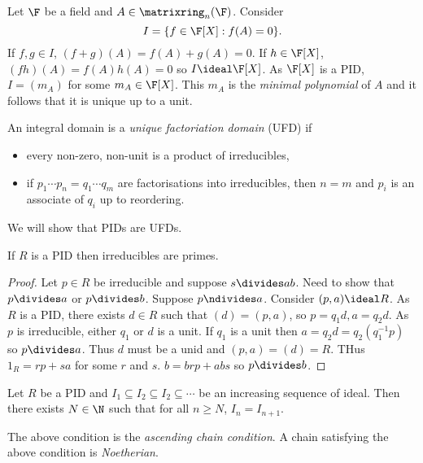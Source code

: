 \documentclass[a4paper]{article}
\theoremstyle{definition}
\begin{document}
\begin{eg}
  Let \(\F\) be a field and \(A \in \matrixring_n(\F)\). Consider
  \[
    I = \{f \in \F[X]: f(A) = 0\}.
  \]
  If \(f , g\in I\), \((f + g)(A) = f(A) + g(A) = 0\). If \(h \in \F[X]\), \((fh)(A) = f(A)h(A) = 0\) so \(I \ideal \F[X]\). As \(\F[X]\) is a PID, \(I = (m_A)\) for some \(m_A \in \F[X]\). This \(m_A\) is the \emph{minimal polynomial} of \(A\) and it follows that it is unique up to a unit.
\end{eg}

\begin{definition}
  An integral domain is a \emph{unique factoriation domain} (UFD) if
  \begin{itemize}
  \item every non-zero, non-unit is a product of irreducibles,
  \item if \(p_1 \cdots p_n = q_1 \cdots q_m\) are factorisations into irreducibles, then \(n = m\) and \(p_i\) is an associate of \(q_i\) up to reordering.
  \end{itemize}
\end{definition}

We will show that PIDs are UFDs.

\begin{lemma}
  If \(R\) is a PID then irreducibles are primes.
\end{lemma}

\begin{proof}
  Let \(p \in R\) be irreducible and suppose \(s \divides ab\). Need to show that \(p \divides a\) or \(p \divides b\). Suppose \(p \ndivides a\). Consider \((p, a) \ideal R\). As \(R\) is a PID, there exists \(d \in R\) such that \((d) = (p, a)\), so \(p = q_1d, a = q_2d\). As \(p\) is irreducible, either \(q_1\) or \(d\) is a unit. If \(q_1\) is a unit then \(a = q_2d = q_2(q_1^{-1}p)\) so \(p \divides a\). Thus \(d\) must be a unid and \((p, a) = (d) = R\). THus \(1_R = rp + sa\) for some \(r\) and \(s\). \(b = brp + abs\) so \(p \divides b\).
\end{proof}

\begin{lemma}
  Let \(R\) be a PID and \(I_1 \subseteq I_2 \subseteq I_2 \subseteq \cdots\) be an increasing sequence of ideal. Then there exists \(N \in \N\) such that for all \(n \geq N\), \(I_n = I_{n + 1}\).
\end{lemma}

\begin{definition}[Noetherian]
  The above condition is the \emph{ascending chain condition}. A chain satisfying the above condition is \emph{Noetherian}.
\end{definition}
\end{document}
